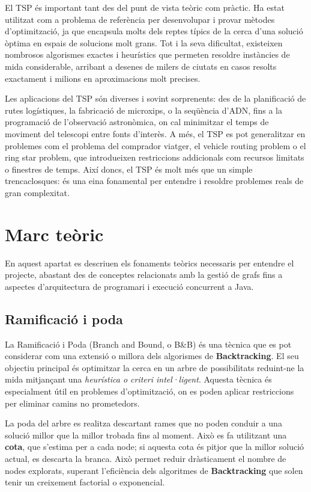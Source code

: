 \documentclass{ieeetj}
\begin{document}
El TSP és important tant des del punt de vista teòric com pràctic. Ha estat utilitzat com a problema de referència per desenvolupar i provar mètodes d’optimització, ja que encapsula molts dels reptes típics de la cerca d’una solució òptima en espais de solucions molt grans. 
Tot i la seva dificultat, existeixen nombrosos algorismes exactes i heurístics que permeten resoldre instàncies de mida considerable, arribant a desenes de milers de ciutats en casos resolts exactament i milions en aproximacions molt precises.\newline

Les aplicacions del TSP\cite{aplicacions-TSP} són diverses i sovint sorprenents: des de la planificació de rutes logístiques, la fabricació de microxips, o la seqüència d’ADN, fins a la programació de l’observació astronòmica, on cal minimitzar el temps de moviment del telescopi entre fonts d’interès. A més, el TSP es pot generalitzar en problemes com el problema del comprador viatger\cite{comprador-viatjer}, el vehicle routing problem\cite{routing-problem} o el ring star problem\cite{ring-star-problem}, que introdueixen restriccions addicionals com recursos limitats o finestres de temps. Així doncs, el TSP és molt més que un simple trencaclosques: és una eina fonamental per entendre i resoldre problemes reals de gran complexitat.


\section{Marc teòric} 
En aquest apartat es descriuen els fonaments teòrics necessaris per entendre el projecte, abastant des de conceptes relacionats amb la gestió de grafs  fins a aspectes d’arquitectura de programari i execució concurrent a Java.

\subsection{Ramificació i poda}
La Ramificació i Poda (Branch and Bound, o B\&B)\cite{BB} és una tècnica que es pot considerar com una extensió o millora dels algorismes de \textbf{Backtracking}. El seu objectiu principal és optimitzar la cerca en un arbre de possibilitats reduint-ne la mida mitjançant una \textit{heurística o criteri intel·ligent}. 
Aquesta tècnica és especialment útil en problemes d’optimització, on es poden aplicar restriccions per eliminar camins no prometedors. \newline

La poda del arbre es realitza descartant rames que no poden conduir a una solució millor que la millor trobada fins al moment. Això es fa utilitzant una \textbf{cota}, que s’estima per a cada node; si aquesta cota és pitjor que la millor solució actual, es descarta la branca. Això permet reduir dràsticament el nombre de nodes explorats, superant l’eficiència dels algoritmes de \textbf{Backtracking} que solen tenir un creixement factorial o exponencial.\newline
\end{document}
